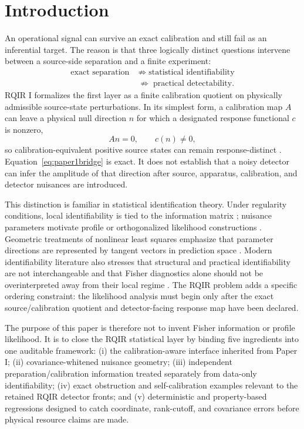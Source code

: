 \section{Introduction}
\label{sec:intro}

An operational signal can survive an exact calibration and still fail as an inferential target. The reason is that three logically distinct questions intervene between a source-side separation and a finite experiment:
\begin{equation}
\begin{aligned}
\text{exact separation}&\;\not\Rightarrow\;\text{statistical identifiability}\\
&\;\not\Rightarrow\;\text{practical detectability}.
\end{aligned}
\label{eq:staging}
\end{equation}
RQIR I formalizes the first layer as a finite calibration quotient on physically admissible source-state perturbations. In its simplest form, a calibration map $A$ can leave a physical null direction $n$ for which a designated response functional $c$ is nonzero,
\begin{equation}
 A n=0,\qquad c(n)\neq0,
\label{eq:paper1bridge}
\end{equation}
so calibration-equivalent positive source states can remain response-distinct \cite{RQIRI}. Equation~\eqref{eq:paper1bridge} is exact. It does not establish that a noisy detector can infer the amplitude of that direction after source, apparatus, calibration, and detector nuisances are introduced.

This distinction is familiar in statistical identification theory. Under regularity conditions, local identifiability is tied to the information matrix \cite{Fisher1922,Rao1945,Rothenberg1971}; nuisance parameters motivate profile or orthogonalized likelihood constructions \cite{CoxReid1987,Cowan2011}. Geometric treatments of nonlinear least squares emphasize that parameter directions are represented by tangent vectors in prediction space \cite{Transtrum2011}. Modern identifiability literature also stresses that structural and practical identifiability are not interchangeable and that Fisher diagnostics alone should not be overinterpreted away from their local regime \cite{Wieland2021,Heinrich2025}. The RQIR problem adds a specific ordering constraint: the likelihood analysis must begin only after the exact source/calibration quotient and detector-facing response map have been declared.

The purpose of this paper is therefore not to invent Fisher information or profile likelihood. It is to close the RQIR statistical layer by binding five ingredients into one auditable framework: (i) the calibration-aware interface inherited from Paper I; (ii) covariance-whitened nuisance geometry; (iii) independent preparation/calibration information treated separately from data-only identifiability; (iv) exact obstruction and self-calibration examples relevant to the retained RQIR detector fronts; and (v) deterministic and property-based regressions designed to catch coordinate, rank-cutoff, and covariance errors before physical resource claims are made.

